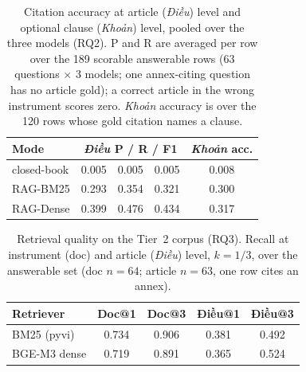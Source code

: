 \documentclass[conference,a4paper]{IEEEtran}
\begin{document}
\begin{table}[t]
\centering
\caption{Citation accuracy at article (\emph{Điều}) level and optional clause (\emph{Khoản}) level, pooled over the three models (RQ2). P and R are averaged per row over the 189 scorable answerable rows (63 questions $\times$ 3 models; one annex-citing question has no article gold); a correct article in the wrong instrument scores zero. \emph{Khoản} accuracy is over the 120 rows whose gold citation names a clause.}
\label{tab:citation}
\begin{tabular}{@{}lcccc@{}}
\toprule
Mode & \multicolumn{3}{c}{\emph{Điều} P / R / F1} & \emph{Khoản} acc. \\
\midrule
closed-book & 0.005 & 0.005 & 0.005 & 0.008 \\
RAG-BM25    & 0.293 & 0.354 & 0.321 & 0.300 \\
RAG-Dense   & 0.399 & 0.476 & 0.434 & 0.317 \\
\bottomrule
\end{tabular}
\end{table}

\begin{table}[t]
\centering
\caption{Retrieval quality on the Tier~2 corpus (RQ3). Recall at instrument (doc) and article (\emph{Điều}) level, $k{=}1/3$, over the answerable set (doc $n{=}64$; article $n{=}63$, one row cites an annex).}
\label{tab:retrieval}
\setlength{\tabcolsep}{3pt}
\footnotesize
\begin{tabular}{@{}lcccc@{}}
\toprule
Retriever & Doc@1 & Doc@3 & Điều@1 & Điều@3 \\
\midrule
BM25 (pyvi) & 0.734 & 0.906 & 0.381 & 0.492 \\
BGE-M3 dense & 0.719 & 0.891 & 0.365 & 0.524 \\
\bottomrule
\end{tabular}
\end{table}
\end{document}
